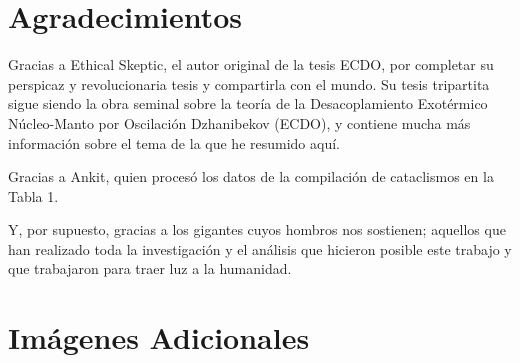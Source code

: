 \documentclass[10pt,twocolumn,letterpaper]{article}
\begin{document}
\section{Agradecimientos}

Gracias a Ethical Skeptic, el autor original de la tesis ECDO, por completar su perspicaz y revolucionaria tesis y compartirla con el mundo. Su tesis tripartita \cite{1} sigue siendo la obra seminal sobre la teoría de la Desacoplamiento Exotérmico Núcleo-Manto por Oscilación Dzhanibekov (ECDO), y contiene mucha más información sobre el tema de la que he resumido aquí.

Gracias a Ankit, quien procesó los datos de la compilación de cataclismos en la Tabla 1.

Y, por supuesto, gracias a los gigantes cuyos hombros nos sostienen; aquellos que han realizado toda la investigación y el análisis que hicieron posible este trabajo y que trabajaron para traer luz a la humanidad.

\clearpage
\twocolumn

\section{Imágenes Adicionales}
\end{document}
